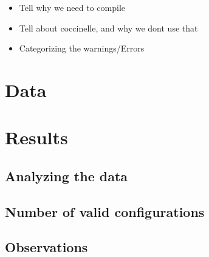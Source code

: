 \documentclass[a4paper,11pt]{article}
\begin{document}
\begin{itemize}
    \item Tell why we need to compile
    \item Tell about coccinelle, and why we dont use that
    \item Categorizing the warnings/Errors
\end{itemize}




\newpage
\section{Data}





\newpage
\section{Results}

\subsection{Analyzing the data}

\subsection{Number of valid configurations}

\subsection{Observations}
\end{document}

